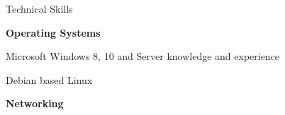 \documentclass[11pt]{tracv}
\begin{document}





%
%
%
%

%
%

%
%

\pagebreak

\begin{hangingsection}{Technical Skills}
	
	\hangingentry \textbf{Operating Systems}
	
	\hangingentry Microsoft Windows 8, 10 and Server knowledge and experience
	
	\hangingentry Debian based Linux
	
	\hangingentry \textbf{Networking}
	
\end{hangingsection}
\end{document}
